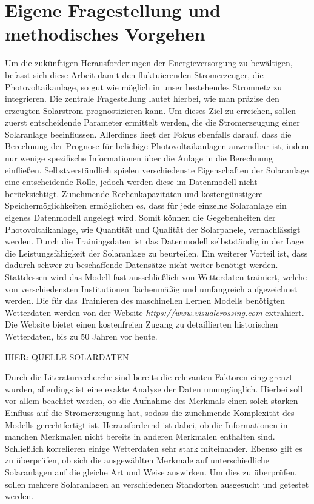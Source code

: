 \documentclass[12pt, a4paper]{article}
\begin{document}

\newpage

\section{Eigene Fragestellung und methodisches Vorgehen}

Um die zukünftigen Herausforderungen der Energieversorgung zu bewältigen, befasst sich diese Arbeit damit den fluktuierenden Stromerzeuger, die Photovoltaikanlage, so gut wie möglich in unser bestehendes Stromnetz zu integrieren. Die zentrale Fragestellung lautet hierbei, wie man präzise den erzeugten Solarstrom prognostizieren kann. Um dieses Ziel zu erreichen, sollen zuerst entscheidende Parameter ermittelt werden, die die Stromerzeugung einer Solaranlage beeinflussen. Allerdings liegt der Fokus ebenfalls darauf, dass die Berechnung der Prognose für beliebige Photovoltaikanlagen anwendbar ist, indem nur wenige spezifische Informationen über die Anlage in die Berechnung einfließen. Selbstverständlich spielen verschiedenste Eigenschaften der Solaranlage eine entscheidende Rolle, jedoch werden diese im Datenmodell nicht berücksichtigt. Zunehmende Rechenkapazitäten und kostengünstigere Speichermöglichkeiten ermöglichen es, dass für jede einzelne Solaranlage ein eigenes Datenmodell angelegt wird. Somit können die Gegebenheiten der Photovoltaikanlage, wie Quantität und Qualität der Solarpanele, vernachlässigt werden. Durch die Trainingsdaten ist das Datenmodell selbstständig in der Lage die Leistungsfähigkeit der Solaranlage zu beurteilen. Ein weiterer Vorteil ist, dass dadurch schwer zu beschaffende Datensätze nicht weiter benötigt werden. Stattdessen wird das Modell fast ausschließlich von Wetterdaten trainiert, welche von verschiedensten Institutionen flächenmäßig und umfangreich aufgezeichnet werden. Die für das Trainieren des maschinellen Lernen Modells benötigten Wetterdaten werden von der Website \textit{https://www.visualcrossing.com} extrahiert. Die Website bietet einen kostenfreien Zugang zu detaillierten historischen Wetterdaten, bis zu 50 Jahren vor heute. 

HIER: QUELLE SOLARDATEN

Durch die Literaturrecherche sind bereits die relevanten Faktoren eingegrenzt wurden, allerdings ist eine exakte Analyse der Daten unumgänglich. Hierbei soll vor allem beachtet werden, ob die Aufnahme des Merkmals einen solch starken Einfluss auf die Stromerzeugung hat, sodass die zunehmende Komplexität des Modells gerechtfertigt ist. Herausfordernd ist dabei, ob die Informationen in manchen Merkmalen nicht bereits in anderen Merkmalen enthalten sind. Schließlich korrelieren einige Wetterdaten sehr stark miteinander. Ebenso gilt es zu überprüfen, ob sich die ausgewählten Merkmale auf unterschiedliche Solaranlagen auf die gleiche Art und Weise auswirken. Um dies zu überprüfen, sollen mehrere Solaranlagen an verschiedenen Standorten ausgesucht und getestet werden.
\end{document}
